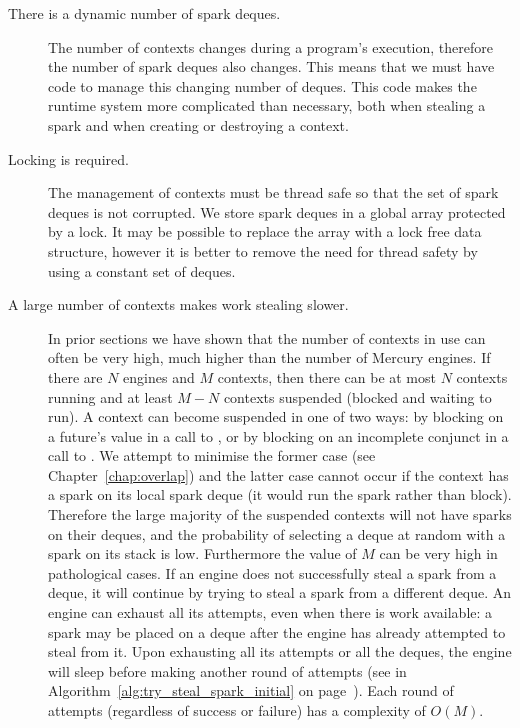 \begin{description}

\item[There is a dynamic number of spark deques.]

The number of contexts changes during a program's execution,
therefore the number of spark deques also changes.
This means that we must have code to manage this changing number of
deques.
This code makes the runtime system more complicated than necessary,
both when stealing a spark and when creating or destroying a context.

\item[Locking is required.]

The management of contexts must be thread safe so that the set of
spark deques is not corrupted.
We store spark deques in a global array protected by a lock.
It may be possible to replace the array with a lock free data structure,
however it is better to remove the need for thread safety by using a
constant set of deques.

\item[A large number of contexts makes work stealing slower.]

In prior sections
we have shown that the number of contexts in use can often be very high,
much higher than the number of Mercury engines.
If there are $N$ engines and $M$ contexts,
then there can be at most $N$ contexts running and
at least $M-N$ contexts suspended (blocked and waiting to run).
A context can become suspended in one of two ways:
by blocking on a future's value in a call to \wait,
or by blocking on an incomplete conjunct in a call to \joinandcontinue.
We attempt to minimise the former case (see Chapter~\ref{chap:overlap})
and the latter case cannot occur
if the context has a spark on its local spark deque (it would run the
spark rather than block).
Therefore the large majority of the suspended contexts will not have
sparks on their deques,
and the probability of selecting a deque at random with a spark on its
stack is low.
Furthermore the value of $M$ can be very high in pathological cases.
If an engine does not successfully steal a spark from a deque,
it will continue by trying to steal a spark from a different deque.
An engine can exhaust all its attempts, even when there is work
available:
a spark may be placed on a deque after the engine has already attempted
to steal from it.
Upon exhausting all its attempts or all the deques,
the engine will sleep before making another round of attempts
(see \trystealspark in Algorithm~\ref{alg:try_steal_spark_initial} on
page~\pageref{alg:try_steal_spark_initial}).
Each round of attempts (regardless of success or failure) has a
complexity of $O(M)$.

\end{description}

